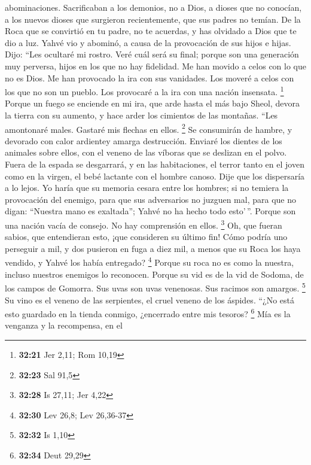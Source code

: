 \begin{paracol}{2}
abominaciones.  Sacrificaban a los demonios, no a Dios, a
dioses que no conocían, a los nuevos dioses que surgieron recientemente,
que sus padres no temían.  De la Roca que se convirtió en
tu padre, no te acuerdas, y has olvidado a Dios que te dio a luz.
 Yahvé vio y abominó, a causa de la provocación de sus
hijos e hijas.  Dijo: ``Les ocultaré mi rostro. Veré cuál
será su final; porque son una generación muy perversa, hijos en los que
no hay fidelidad.  Me han movido a celos con lo que no es
Dios. Me han provocado la ira con sus vanidades. Los moveré a celos con
los que no son un pueblo. Los provocaré a la ira con una nación
insensata. \footnote{\textbf{32:21} Jer 2,11; Rom 10,19} 
Porque un fuego se enciende en mi ira, que arde hasta el más bajo Sheol,
devora la tierra con su aumento, y hace arder los cimientos de las
montañas.  ``Les amontonaré males. Gastaré mis flechas en
ellos. \footnote{\textbf{32:23} Sal 91,5}  Se consumirán
de hambre, y devorado con calor ardientey amarga destrucción. Enviaré
los dientes de los animales sobre ellos, con el veneno de las víboras
que se deslizan en el polvo.  Fuera de la espada se
desgarrará, y en las habitaciones, el terror tanto en el joven como en
la virgen, el bebé lactante con el hombre canoso.  Dije
que los dispersaría a lo lejos. Yo haría que su memoria cesara entre los
hombres;  si no temiera la provocación del enemigo, para
que sus adversarios no juzguen mal, para que no digan: ``Nuestra mano es
exaltada''; Yahvé no ha hecho todo esto'\,''.  Porque son
una nación vacía de consejo. No hay comprensión en ellos. \footnote{\textbf{32:28}
  Is 27,11; Jer 4,22}  Oh, que fueran sabios, que
entendieran esto, ¡que consideren su último fin!  Cómo
podría uno perseguir a mil, y dos pusieron en fuga a diez mil, a menos
que su Roca los haya vendido, y Yahvé los había entregado? \footnote{\textbf{32:30}
  Lev 26,8; Lev 26,36-37}  Porque su roca no es como la
nuestra, incluso nuestros enemigos lo reconocen.  Porque
su vid es de la vid de Sodoma, de los campos de Gomorra. Sus uvas son
uvas venenosas. Sus racimos son amargos. \footnote{\textbf{32:32} Is
  1,10}  Su vino es el veneno de las serpientes, el cruel
veneno de los áspides.  ``¿No está esto guardado en la
tienda conmigo, ¿encerrado entre mis tesoros? \footnote{\textbf{32:34}
  Deut 29,29}  Mía es la venganza y la recompensa, en el

\end{paracol}
